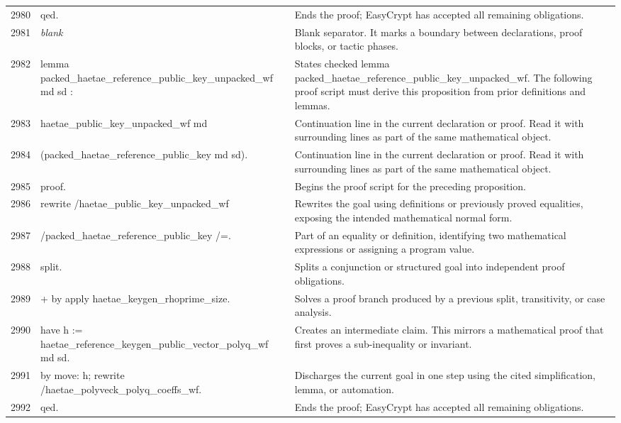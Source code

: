 \documentclass[10pt]{article}
\begin{document}
\begin{longtable}{r L{0.53\textwidth} L{0.37\textwidth}}
2980 & {\ttfamily\scriptsize qed.} & Ends the proof; EasyCrypt has accepted all remaining obligations. \\
2981 & {\ttfamily\scriptsize \emph{blank}} & Blank separator.  It marks a boundary between declarations, proof blocks, or tactic phases. \\
2982 & {\ttfamily\scriptsize lemma packed\_haetae\_reference\_public\_key\_unpacked\_wf md sd :} & States checked lemma packed\_haetae\_reference\_public\_key\_unpacked\_wf.  The following proof script must derive this proposition from prior definitions and lemmas. \\
2983 & {\ttfamily\scriptsize   haetae\_public\_key\_unpacked\_wf md} & Continuation line in the current declaration or proof.  Read it with surrounding lines as part of the same mathematical object. \\
2984 & {\ttfamily\scriptsize     (packed\_haetae\_reference\_public\_key md sd).} & Continuation line in the current declaration or proof.  Read it with surrounding lines as part of the same mathematical object. \\
2985 & {\ttfamily\scriptsize proof.} & Begins the proof script for the preceding proposition. \\
2986 & {\ttfamily\scriptsize rewrite /haetae\_public\_key\_unpacked\_wf} & Rewrites the goal using definitions or previously proved equalities, exposing the intended mathematical normal form. \\
2987 & {\ttfamily\scriptsize         /packed\_haetae\_reference\_public\_key /=.} & Part of an equality or definition, identifying two mathematical expressions or assigning a program value. \\
2988 & {\ttfamily\scriptsize split.} & Splits a conjunction or structured goal into independent proof obligations. \\
2989 & {\ttfamily\scriptsize + by apply haetae\_keygen\_rhoprime\_size.} & Solves a proof branch produced by a previous split, transitivity, or case analysis. \\
2990 & {\ttfamily\scriptsize have h := haetae\_reference\_keygen\_public\_vector\_polyq\_wf md sd.} & Creates an intermediate claim.  This mirrors a mathematical proof that first proves a sub-inequality or invariant. \\
2991 & {\ttfamily\scriptsize by move: h; rewrite /haetae\_polyveck\_polyq\_coeffs\_wf.} & Discharges the current goal in one step using the cited simplification, lemma, or automation. \\
2992 & {\ttfamily\scriptsize qed.} & Ends the proof; EasyCrypt has accepted all remaining obligations. \\

\end{longtable}
\end{document}
